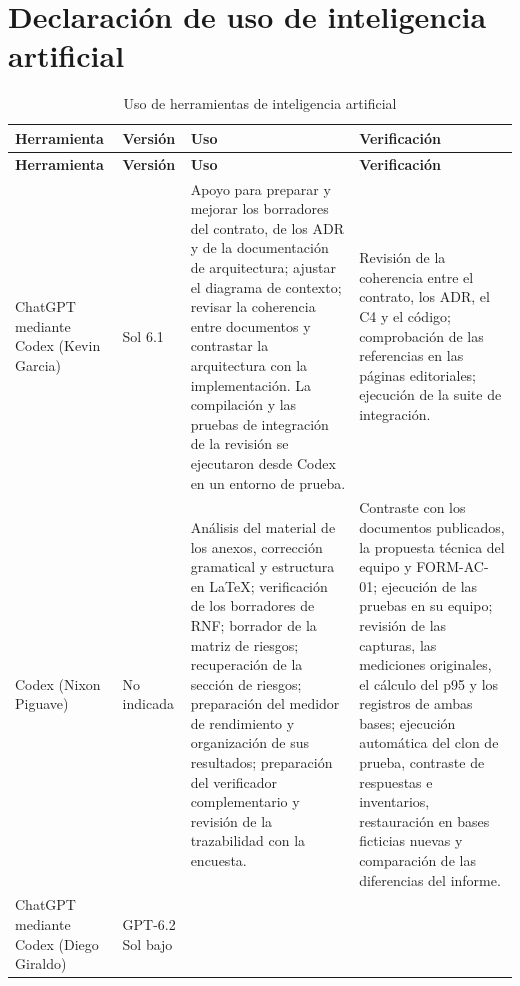 \documentclass[11pt,a4paper]{article}
\begin{document}
	\section{Declaración de uso de inteligencia artificial}
	\begin{xltabular}{\textwidth}{L{2.5cm}L{2cm}XX}
		\caption{Uso de herramientas de inteligencia artificial}\label{tab:ia}\\
		\toprule
		\textbf{Herramienta} & \textbf{Versión} & \textbf{Uso} & \textbf{Verificación} \\
		\midrule
		\endfirsthead
		\toprule
		\textbf{Herramienta} & \textbf{Versión} & \textbf{Uso} & \textbf{Verificación} \\
		\midrule
		\endhead
		\bottomrule
		\endfoot
		ChatGPT mediante Codex (Kevin Garcia) & Sol 6.1 & Apoyo para preparar y mejorar los borradores del contrato, de los ADR y de la documentación de arquitectura; ajustar el diagrama de contexto; revisar la coherencia entre documentos y contrastar la arquitectura con la implementación. La compilación y las pruebas de integración de la revisión se ejecutaron desde Codex en un entorno de prueba. & Revisión de la coherencia entre el contrato, los ADR, el C4 y el código; comprobación de las referencias en las páginas editoriales; ejecución de la suite de integración. \\
		Codex (Nixon Piguave) & No indicada & Análisis del material de los anexos, corrección gramatical y estructura en LaTeX; verificación de los borradores de RNF; borrador de la matriz de riesgos; recuperación de la sección de riesgos; preparación del medidor de rendimiento y organización de sus resultados; preparación del verificador complementario y revisión de la trazabilidad con la encuesta. & Contraste con los documentos publicados, la propuesta técnica del equipo y FORM-AC-01; ejecución de las pruebas en su equipo; revisión de las capturas, las mediciones originales, el cálculo del p95 y los registros de ambas bases; ejecución automática del clon de prueba, contraste de respuestas e inventarios, restauración en bases ficticias nuevas y comparación de las diferencias del informe. \\
		ChatGPT mediante Codex (Diego Giraldo) & GPT-6.2 Sol bajo &

\end{xltabular}
\end{document}

